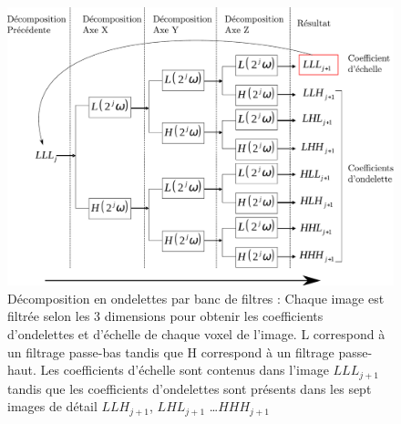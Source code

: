 \begin{figure}
 \includegraphics[width=15cm]{images/decompHotell}
 \caption[Décomposition en ondelettes par banc de filtres]{Décomposition en ondelettes par banc de filtres : Chaque image est filtrée selon les 3 dimensions pour obtenir les coefficients d'ondelettes et d'échelle de chaque voxel de l'image. L correspond à un filtrage passe-bas tandis que H correspond à un filtrage passe-haut. Les coefficients d'échelle sont contenus dans l'image $LLL_{j+1}$ tandis que les coefficients d'ondelettes sont présents dans les sept images de détail $LLH_{j+1}$, $LHL_{j+1}$ \dots $HHH_{j+1}$ }
 \label{fig:ondelettes}
\end{figure}


